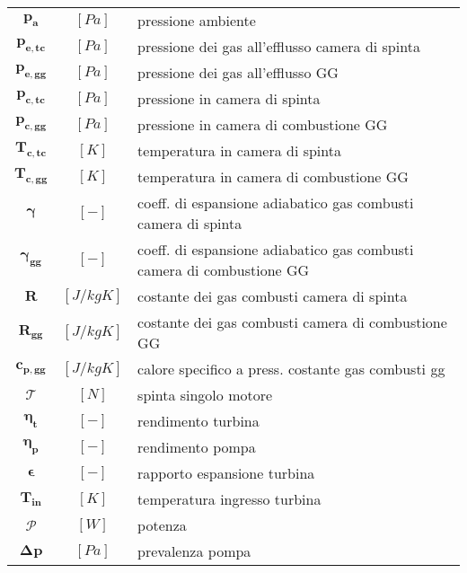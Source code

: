 \begin{multicols}{2}
\begin{tabularx}{\linewidth}{ccX}
		$\bm{p_a}$ & $[Pa]$ & pressione ambiente \\
		$\bm{p_{e,tc}}$ & $[Pa]$ & pressione dei gas all'efflusso camera di spinta \\
		$\bm{p_{e,gg}}$ & $[Pa]$ & pressione dei gas all'efflusso GG\\
		$\bm{p_{c,tc}}$ & $[Pa]$ & pressione in camera di spinta\\
		$\bm{p_{c,gg}}$ & $[Pa]$ & pressione in camera di combustione GG\\
		$\bm{T_{c,tc}}$ & $[K]$ & temperatura in camera di spinta\\
		$\bm{T_{c,gg}}$ & $[K]$ & temperatura in camera di combustione GG\\
		$\bm{\gamma}$ & $[-]$ & coeff. di espansione adiabatico gas combusti camera di spinta\\
		$\bm{\gamma_{gg}}$ & $[-]$ & coeff. di espansione adiabatico gas combusti camera di combustione GG\\
		$\bm{R}$ & $[J/kgK]$ & costante dei gas combusti camera di spinta\\
		$\bm{R_{gg}}$ & $[J/kgK]$ & costante dei gas combusti camera di combustione GG\\
		$\bm{c_{p,gg}}$ & $[J/kgK]$ & calore specifico a press. costante gas combusti gg\\
		$\bm{\mathcal{T}}$ & $[N]$ & spinta singolo motore\\
		$\bm{\eta_t}$ & $[-]$ & rendimento turbina\\
		$\bm{\eta_p}$ & $[-]$ & rendimento pompa\\
		$\bm{\epsilon}$ & $[-]$ & rapporto espansione turbina\\
		$\bm{T_{in}}$ & $[K]$ & temperatura ingresso turbina\\
		$\bm{\mathcal{P}}$ & $[W]$ & potenza\\
		$\bm{\Delta p}$ & $[Pa]$ & prevalenza pompa\\
	\end{tabularx}


\end{multicols}
